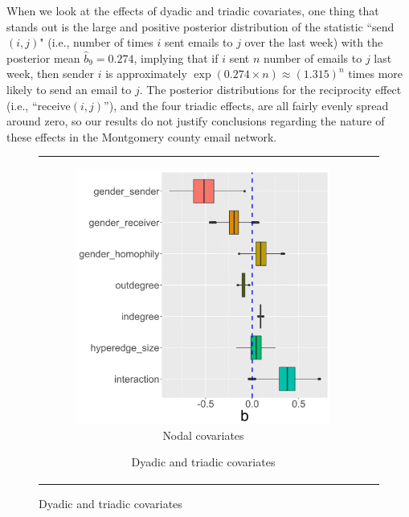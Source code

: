 \documentclass[ba]{imsart}
\numberwithin{equation}{section}
\theoremstyle{plain}
\begin{document}
	When we look at the effects of dyadic and triadic covariates, one thing that stands out is the large and positive posterior distribution of the statistic ``send$(i,j)$" (i.e., number of times $i$ sent emails to $j$ over the last week) with the posterior mean $\hat{b}_9 = 0.274$, implying that if $i$ sent $n$ number of emails to $j$ last week, then sender $i$ is approximately $\exp(0.274\times n)\approx(1.315)^n$ times more likely to send an email to $j$. The posterior distributions for the reciprocity effect (i.e., ``receive$(i, j)$''), and the four triadic effects, are all fairly evenly spread around zero, so our results do not justify conclusions regarding the nature of these effects in the Montgomery county email network.
			\begin{figure}[!t]
				\centering
				\begin{tabular}[t]{cc}
					\begin{subfigure}[b]{0.4975\textwidth}
						\caption{Nodal covariates}
						\includegraphics[width=\textwidth]{img/betanewplot2-1.png}	
					\end{subfigure}
					\begin{subfigure}[b]{0.4975\textwidth}
						\caption{Dyadic and triadic covariates}

\end{subfigure}
\end{tabular}
\end{figure}
\end{document}
